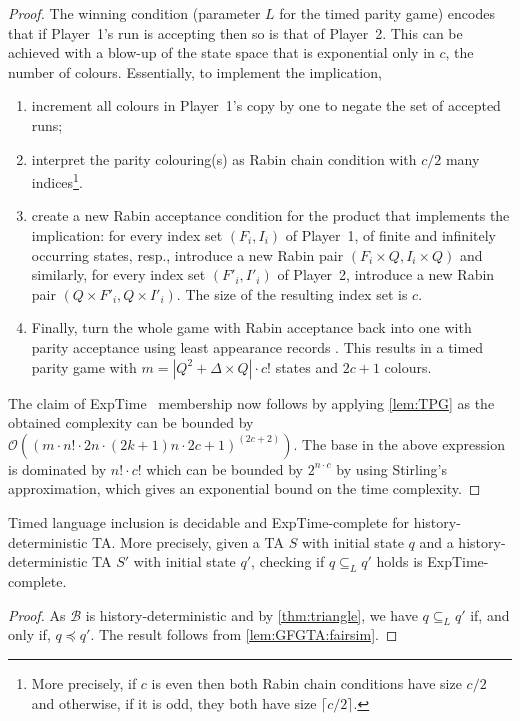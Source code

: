 \documentclass[10pt,a4paper]{amsart}
\theoremstyle{definition}
\numberwithin{equation}{section}
\newcommand{\x}{\times}
\newcommand{\card}[1]{|#1|}
\newcommand{\autb}{\mathcal{B}}
\newcommand{\exptime}{\EXPTIME}
\newcommand{\states}{Q}
\newcommand{\transitions}{\Delta}
\newcommand{\langincl}[1][L]{\subseteq_{L}}
\newcommand{\fairsim}[1][]{\preceq}
\newcommand{\lts}{S}
\newcommand{\EXPTIME}{{\sc ExpTime}}
\begin{document}
\begin{proof}
The winning condition (parameter $L$ for the timed parity game) encodes
that if Player~1's run is accepting then so is that of Player~2.
This can be achieved with a blow-up of the state space that is exponential only in $c$, the number of colours.
Essentially, to implement the implication, 
\begin{enumerate}
    \item increment all colours in Player~1's copy by one to negate the set of accepted runs;
    \item interpret the parity colouring(s) as Rabin chain condition with $c/2$ many indices\footnote{More precisely, if $c$ is even then both Rabin chain conditions have size $c/2$ and otherwise, if it is odd, they both have size $\lceil c/2\rceil$.}.
    \item create a new Rabin acceptance condition for the product that implements the implication:
        for every index set $(F_i,I_i)$ of Player~1, of finite and infinitely occurring states, resp.,
        introduce a new Rabin pair $(F_i\x\states, I_i\x\states)$ and similarly,
        for every index set $(F'_i,I'_i)$ of Player~2, introduce a new Rabin pair $(\states\x F'_i, \states\x I'_i)$. The size of the resulting index set is $c$. 
    \item Finally, turn the whole game with Rabin acceptance back into one with parity acceptance
        using least appearance records \cite{Gurevi82,Dziemb97}.
        This results in a timed parity game with $m=\card{\states^2+\transitions\x\states} \cdot c!$
        states and $2c+1$ colours.
\end{enumerate}
The claim of \exptime~ membership now follows by applying \cref{lem:TPG} as the obtained complexity can be bounded by $\mathcal{O}((m\cdot n!\cdot 2n \cdot (2k+1)n \cdot 2c+1)^{(2c+2)})$. The base in the above expression is dominated by $n!\cdot c!$ which can be bounded by $2^{n\cdot c}$ by using Stirling's approximation, which gives an exponential bound on the time complexity. 
\end{proof}
\begin{corollary}\label{cor:inclusion}
    Timed language inclusion is decidable and \EXPTIME-complete
    for history-deterministic TA.
    More precisely, given 
    a TA $\lts$ with initial state $q$
    and a history-deterministic TA $\lts'$ with initial state $q'$,
    checking if $q\langincl q'$ holds is \EXPTIME-complete.
\end{corollary}
\begin{proof}
    As $\autb$ is history-deterministic and by
    \cref{thm:triangle},
    we have 
    $q\langincl q'$ if, and only if,
    $q\fairsim q'$.
    The result follows from 
    \cref{lem:GFGTA:fairsim}.
\end{proof}
\end{document}
